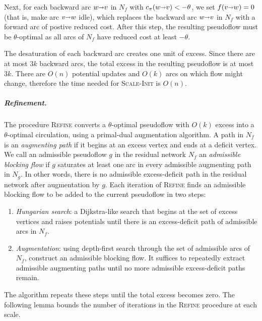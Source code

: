 \documentclass[a4paper,UKenglish]{socg-lipics-v2018}
\def\arcto{\mathord\shortrightarrow}
\def\arc#1#2{#1\arcto#2}
\theoremstyle{plain}
\numberwithin{figure}{section}
\renewcommand{\paragraph}{\subparagraph}
\def\EMPH#1{\textcolor{BrickRed}{{\emph{#1}}}}
\begin{document}
Next, for each backward arc $\arc wv$ in $N_f$ with $c_\pi(\arc wv) < -\theta$,
we set $f(\arc vw) = 0$ (that is, make arc $\arc vw$ idle), which replaces the
backward arc $\arc wv$ in $N_f$ with a forward arc of postive reduced cost.
After this step, the resulting pseudoflow must be $\theta$-optimal as all arcs
of $N_f$ have reduced cost at least $-\theta$.

The desaturation of each backward arc creates one unit of excess.
Since there are at most $3k$ backward arcs, the total excess in the resulting
pseudoflow is at most $3k$.
There are $O(n)$ potential updates and $O(k)$ arcs on which flow might change,
therefore the time needed for \textsc{Scale-Init} is $O(n)$.

\paragraph{Refinement.}
The procedure \textsc{Refine} converts a $\theta$-optimal pseudoflow with
$O(k)$ excess into a $\theta$-optimal circulation, using a primal-dual
augmentation algorithm.
A path in $N_f$ is an \EMPH{augmenting path} if it begins at an excess vertex
and ends at a deficit vertex.
We call an admissible pseudoflow $g$ in the residual network $N_f$ an
\EMPH{admissible blocking flow} if $g$ saturates at least one arc in every
admissible augmenting path in $N_g$.
In other words, there is no admissible excess-deficit path in the residual
network after augmentation by $g$.
Each iteration of \textsc{Refine} finds an admissible blocking flow to be added
to the current pseudoflow in two steps:
\begin{enumerate}
\item
\EMPH{Hungarian search}: a Dijkstra-like search that begins at the set of
excess vertices and raises potentials until there is an excess-deficit path
of admissible arcs in $N_f$.
\item
\EMPH{Augmentation}: using depth-first search through the set of admissible
arcs of $N_f$, construct an admissible blocking flow.
It suffices to repeatedly extract admissible augmenting paths until no more
admissible excess-deficit paths remain.
\end{enumerate}
The algorithm repeats these steps until the total excess becomes zero.
The following lemma bounds the number of iterations in the \textsc{Refine}
procedure at each scale.
\end{document}
